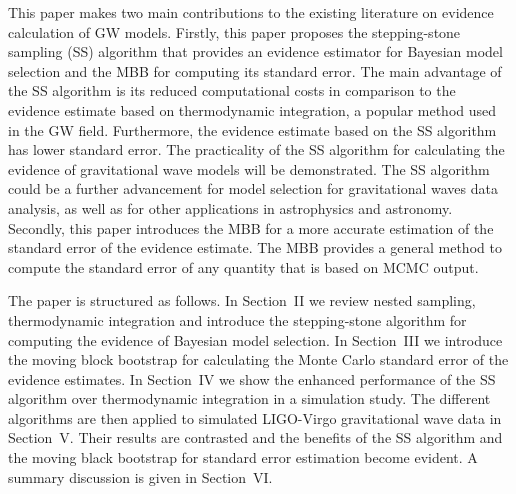 \documentclass[aps,reprint,amsmath,amssymb,showpacs,showkeys]{revtex4-1}%
\newcommand{\cb}{ \color{blue}}
\begin{document}
This paper makes two main contributions to the existing literature on evidence calculation of GW models. Firstly, 
 this paper proposes the stepping-stone sampling (SS) algorithm \citep{Xie:Lewis:Fan:Kuo:Chen:2011} that provides an evidence estimator for Bayesian model selection and the MBB for computing its standard error.  The main advantage of the SS algorithm is its reduced computational costs in comparison to the evidence estimate based on thermodynamic integration, a
 popular method used in the GW field.
Furthermore, the evidence estimate based on the SS algorithm has lower standard error. 
The practicality of the SS algorithm for calculating the evidence of gravitational wave models will be demonstrated. The SS algorithm could be a further advancement for model selection for gravitational waves data analysis, as well as for other applications in astrophysics and astronomy. Secondly, this paper introduces the MBB for a more accurate estimation of the standard error of the evidence estimate. The MBB provides a general method to compute the standard error of any quantity that is based on MCMC output.















The paper is structured as follows. In Section~II we review nested sampling, thermodynamic integration and introduce the stepping-stone algorithm for computing the evidence of Bayesian model selection. In Section~III we introduce the moving block bootstrap for calculating the Monte Carlo standard error of the evidence estimates. In Section~IV we show the enhanced performance of the SS algorithm over thermodynamic integration in a simulation study. The different algorithms are then  applied  to simulated LIGO-Virgo gravitational wave data in Section~V. Their results are contrasted and  the benefits of the SS algorithm and the moving black bootstrap for standard error estimation become evident. A summary discussion is given in Section~VI.
\end{document}
